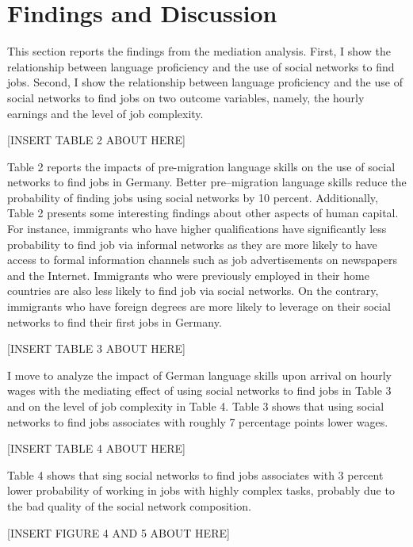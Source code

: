 \documentclass[12pt,a4paper]{article}
\begin{document}
\section{Findings and Discussion}
This section reports the findings from the mediation analysis. First, I show the relationship between language proficiency and the use of social networks to find jobs. Second, I show the relationship between language proficiency and the use of social networks to find jobs on two outcome variables, namely, the hourly earnings and the level of job complexity.

\begin{center}
[INSERT TABLE 2 ABOUT HERE]
\end{center}

Table 2 reports the impacts of pre-migration language skills on the use of social networks to find jobs in Germany. Better pre--migration language skills reduce the probability of finding jobs using social networks by 10 percent. Additionally, Table 2 presents some interesting findings about other aspects of human capital. For instance, immigrants who have higher qualifications have significantly less probability to find job via informal networks as they are more likely to have access to formal information channels such as job advertisements on newspapers and the Internet. Immigrants who were previously employed in their home countries are also less likely to find job via social networks. On the contrary, immigrants who have foreign degrees are more likely to leverage on their social networks to find their first jobs in Germany.

\begin{center}
[INSERT TABLE 3 ABOUT HERE]
\end{center}

I move to analyze the impact of German language skills upon arrival on hourly wages with the mediating effect of using social networks to find jobs in Table 3 and on the level of job complexity in Table 4. Table 3 shows that using social networks to find jobs associates with roughly 7 percentage points lower wages.

\begin{center}
[INSERT TABLE 4 ABOUT HERE]
\end{center}
Table 4 shows that sing social networks to find jobs associates with 3 percent lower probability of working in jobs with highly complex tasks, probably due to the bad quality of the social network composition. 

\begin{center}
[INSERT FIGURE 4 AND 5 ABOUT HERE]
\end{center}
\end{document}

